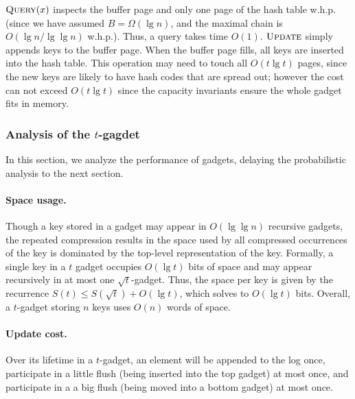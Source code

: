 \documentclass[letterpaper,11pt]{article}
\newcommand{\proc}[1]{\textnormal{\scshape#1}}
\begin{document}
$\proc{Query}(x)$ inspects the buffer page and only one page of the
hash table w.h.p. (since we have assumed $B = \Omega(\lg n)$, and the
maximal chain is $O(\lg n / \lg\lg n)$ w.h.p.). Thus, a query takes
time $O(1)$. $\proc{Update}$ simply appends keys to the buffer
page. When the buffer page fills, all keys are inserted into the hash
table. This operation may need to touch all $O(t\lg t)$ pages, since
the new keys are likely to have hash codes that are spread out;
however the cost can not exceed $O(t \lg t)$ since the capacity
invariants ensure the whole gadget fits in memory.


\subsubsection{Analysis of the $t$-gagdet} \label{s:analysis}

In this section, we analyze the performance of gadgets, delaying the
probabilistic analysis to the next section.

\paragraph{Space usage.} 
Though a key stored in a gadget may appear in $O(\lg\lg n)$ recursive
gadgets, the repeated compression results in the space used by all
compressed occurrences of the key is dominated by the top-level
representation of the key.  Formally, a single key in a $t$ gadget
occupies $O(\lg t)$ bits of space and may appear recursively in at
most one $\sqrt{t}$-gadget. Thus, the space per key is given by the
recurrence $S(t)\leq S(\sqrt{t})+O(\lg t)$, which solves to $O(\lg t)$
bits. Overall, a $t$-gadget storing $n$ keys uses $O(n)$ words of
space.

\paragraph{Update cost.}
Over its lifetime in a $t$-gadget, an element will be appended to the
log once, participate in a little flush (being inserted into the top
gadget) at most once, and participate in a a big flush (being moved
into a bottom gadget) at most once.
\end{document}
